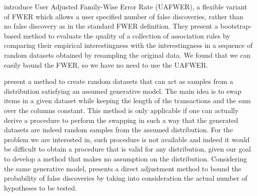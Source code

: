 \citet{LallichTP06} introduce User Adjusted
Family-Wise Error Rate (UAFWER), a flexible variant of FWER which allows a user
specified number of false discoveries, rather than no false discovery as in the
standard FWER definition. They present a bootstrap-based method to evaluate the
quality of a collection of association rules by comparing their empirical
interestingness with the interestingness in a sequence of random datasets
obtained by resampling the original data. We found that we can easily bound the
FWER, so we have no need to use the UAFWER.
\fi

\citet{GionisMMT07} present a method to create random datasets that can act as
samples from a distribution satisfying an assumed generative model. The main
idea is to swap items in a given dataset while keeping the length of the
transactions and the sum over the columns constant. This method is only
applicable if one can actually derive a procedure to perform the swapping in
such a way that the generated datasets are indeed random samples from the assumed
distribution. For the problem we are interested in, such procedure is not
available and indeed it would be difficult to obtain a procedure that is
valid for any distribution, given our goal to develop a method that makes
no assumption on the distribution. Considering the same generative model,
\citet{Hanhijarvi11} presents a direct adjustment method to bound the
probability of false discoveries by %
taking into consideration the actual number of hypotheses to be tested.


